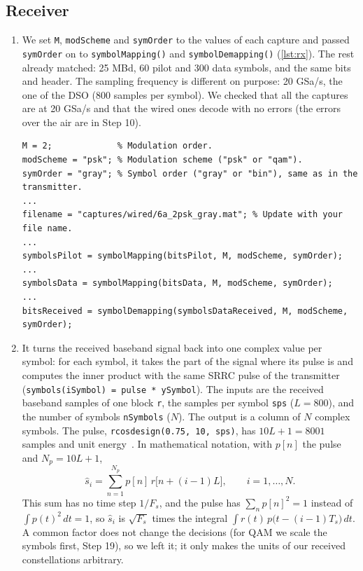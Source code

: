 \documentclass[11pt]{article}
\begin{document}
\subsection*{Receiver}
\begin{enumerate}[resume]
    \item We set \texttt{M}, \texttt{modScheme} and \texttt{symOrder} to the values of each capture and passed \texttt{symOrder} on to \texttt{symbolMapping()} and \texttt{symbolDemapping()} (\cref{lst:rx}). The rest already matched: 25 MBd, 60 pilot and 300 data symbols, and the same bits and header. The sampling frequency is different on purpose: 20 GSa/s, the one of the DSO (800 samples per symbol). We checked that all the captures are at 20 GSa/s and that the wired ones decode with no errors (the errors over the air are in Step 10).

\begin{lstlisting}[caption={Our changes to \texttt{receiverSC.m}.}, label={lst:rx}]
M = 2;             % Modulation order.
modScheme = "psk"; % Modulation scheme ("psk" or "qam").
symOrder = "gray"; % Symbol order ("gray" or "bin"), same as in the transmitter.
...
filename = "captures/wired/6a_2psk_gray.mat"; % Update with your file name.
...
symbolsPilot = symbolMapping(bitsPilot, M, modScheme, symOrder);
...
symbolsData = symbolMapping(bitsData, M, modScheme, symOrder);
...
bitsReceived = symbolDemapping(symbolsDataReceived, M, modScheme, symOrder);
\end{lstlisting}

    \item It turns the received baseband signal back into one complex value per symbol: for each symbol, it takes the part of the signal where its pulse is and computes the inner product with the same SRRC pulse of the transmitter (\texttt{symbols(iSymbol) = pulse * ySymbol}). The inputs are the received baseband samples of one block \texttt{r}, the samples per symbol \texttt{sps} ($L = 800$), and the number of symbols \texttt{nSymbols} ($N$). The output is a column of $N$ complex symbols. The pulse, \texttt{rcosdesign(0.75, 10, sps)}, has $10L + 1 = 8001$ samples and unit energy~\cite{rcosdesign}. In mathematical notation, with $p[n]$ the pulse and $N_p = 10L+1$,
    \begin{equation}
        \hat{s}_i = \sum_{n=1}^{N_p} p[n]\, r\big[n + (i-1)L\big], \qquad i = 1, \dots, N.
    \end{equation}
    This sum has no time step $1/F_s$, and the pulse has $\sum_n p[n]^2 = 1$ instead of $\int p(t)^2\, dt = 1$, so $\hat{s}_i$ is $\sqrt{F_s}$ times the integral $\int r(t)\, p\big(t - (i-1)T_s\big)\, dt$. A common factor does not change the decisions (for QAM we scale the symbols first, Step 19), so we left it; it only makes the units of our received constellations arbitrary.


\end{enumerate}
\end{document}
